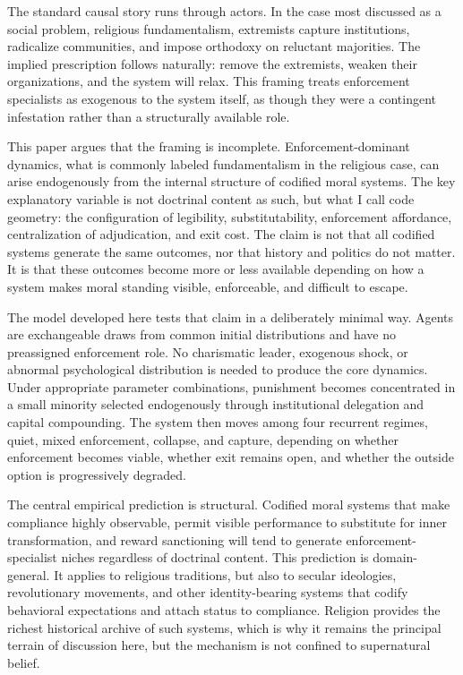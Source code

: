\documentclass[12pt]{article}
\begin{document}
The standard causal story runs through actors. In the case most discussed as a social problem, religious fundamentalism, extremists capture institutions, radicalize communities, and impose orthodoxy on reluctant majorities. The implied prescription follows naturally: remove the extremists, weaken their organizations, and the system will relax. This framing treats enforcement specialists as exogenous to the system itself, as though they were a contingent infestation rather than a structurally available role.

This paper argues that the framing is incomplete. Enforcement-dominant dynamics, what is commonly labeled fundamentalism in the religious case, can arise endogenously from the internal structure of codified moral systems. The key explanatory variable is not doctrinal content as such, but what I call code geometry: the configuration of legibility, substitutability, enforcement affordance, centralization of adjudication, and exit cost. The claim is not that all codified systems generate the same outcomes, nor that history and politics do not matter. It is that these outcomes become more or less available depending on how a system makes moral standing visible, enforceable, and difficult to escape.

The model developed here tests that claim in a deliberately minimal way. Agents are exchangeable draws from common initial distributions and have no preassigned enforcement role. No charismatic leader, exogenous shock, or abnormal psychological distribution is needed to produce the core dynamics. Under appropriate parameter combinations, punishment becomes concentrated in a small minority selected endogenously through institutional delegation and capital compounding. The system then moves among four recurrent regimes, quiet, mixed enforcement, collapse, and capture, depending on whether enforcement becomes viable, whether exit remains open, and whether the outside option is progressively degraded.

The central empirical prediction is structural. Codified moral systems that make compliance highly observable, permit visible performance to substitute for inner transformation, and reward sanctioning will tend to generate enforcement-specialist niches regardless of doctrinal content. This prediction is domain-general. It applies to religious traditions, but also to secular ideologies, revolutionary movements, and other identity-bearing systems that codify behavioral expectations and attach status to compliance. Religion provides the richest historical archive of such systems, which is why it remains the principal terrain of discussion here, but the mechanism is not confined to supernatural belief.
\end{document}

